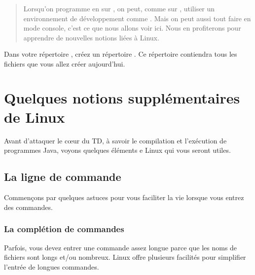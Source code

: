 \documentclass[a4paper,11pt]{style-esi/td}
\begin{document}
\entete
\titre
{}
\lastedit

\bigskip
\begin{abstract}
    Lorsqu'on programme en  sur ,
    on peut, comme sur ,
    utiliser un environnement de développement comme .
    Mais on peut aussi tout faire en mode console, 
    c'est ce que nous allons voir ici.
    Nous en profiterons pour apprendre de nouvelles notions liées à Linux.
\end{abstract}

\bigskip
\tableofcontents

\vfill
\begin{infobox}
    Dans votre répertoire , 
    créez un répertoire . 
    Ce répertoire contiendra tous les fichiers que vous allez créer aujourd'hui. 
\end{infobox}

\newpage

\section{Quelques notions supplémentaires de Linux}

	Avant d'attaquer le c\oe{}ur du TD, 
	à savoir le compilation et l'exécution de programmes Java,
	voyons quelques éléments e Linux qui vous seront utiles.

	\subsection{La ligne de commande}
              
		Commençons par quelques astuces 
		pour vous faciliter la vie lorsque vous entrez des commandes.
		
		\subsubsection*{La complétion de commandes}

			Parfois, vous devez entrer une commande assez longue 
			parce que les noms de fichiers sont longs et/ou nombreux.
			Linux offre plusieurs facilités pour simplifier l'entrée de longues commandes.  
\end{document}
